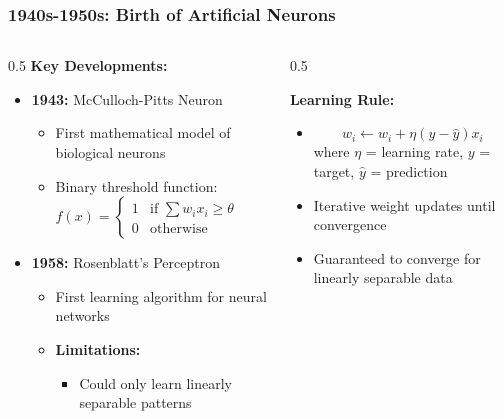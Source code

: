 \documentclass[5pt,aspectratio=169]{beamer}
\begin{document}
\begin{frame}
\frametitle{1940s-1950s: Birth of Artificial Neurons}

\begin{columns}[T]
\begin{column}{0.5\textwidth}
\textbf{Key Developments:}
\begin{itemize}
\item \textbf{1943:} McCulloch-Pitts Neuron
\begin{itemize}
\item First mathematical model of biological neurons
\item Binary threshold function: 
\( f(x) = \begin{cases} 
1 & \text{if } \sum w_i x_i \geq \theta \\
0 & \text{otherwise}
\end{cases} \)
\end{itemize}

\item \textbf{1958:} Rosenblatt's Perceptron
\begin{itemize}
\item First learning algorithm for neural networks
\item \textbf{Limitations:}
\begin{itemize}
\item Could only learn linearly separable patterns
\end{itemize} 

\end{itemize}
\end{itemize}
\end{column}

\begin{column}{0.5\textwidth}

\vspace{0.5cm}
\textbf{Learning Rule:}
\begin{itemize}
    \item 
  \[
  w_i \leftarrow w_i + \eta(y - \hat{y})x_i
  \]
  \small{where \(\eta\) = learning rate, \(y\) = target, \(\hat{y}\) = prediction}
\item Iterative weight updates until convergence
\item Guaranteed to converge for linearly separable data
\end{itemize}

\end{column}
\end{columns}
\end{frame}
\end{document}
